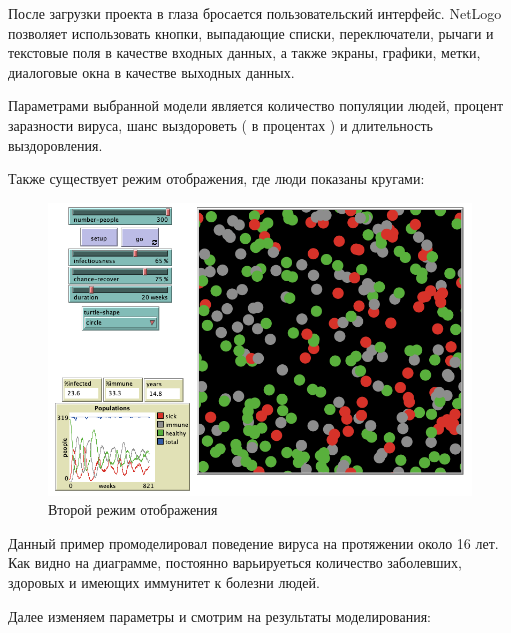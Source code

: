 \documentclass[14pt,a4paper,report]{report}
\begin{document}
После загрузки проекта в глаза бросается пользовательский интерфейс. NetLogo позволяет использовать кнопки, выпадающие списки, переключатели, рычаги и текстовые поля в качестве входных данных, а также экраны, графики, метки, диалоговые окна в качестве выходных данных.

Параметрами выбранной модели является количество популяции людей, процент заразности вируса, шанс выздороветь ( в процентах ) и длительность выздоровления.


\clearpage
Также существует режим отображения, где люди показаны кругами:

\begin{figure}[h!]
	\centering
	\includegraphics[scale = 0.60]{images/3.png}
	\caption{Второй режим отображения}
\end{figure}

Данный пример промоделировал поведение вируса на протяжении около 16 лет. Как видно на диаграмме, постоянно варьируеться количество заболевших, здоровых и имеющих иммунитет к болезни людей.


Далее изменяем параметры и смотрим на результаты моделирования:
\end{document}
